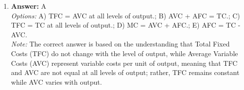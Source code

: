 \documentclass[12pt]{article}
\begin{document}
\begin{enumerate}[label=\arabic*.]
\\ \textit{Options:} A) Society does not get enough output.; B) There is perfect competition in the market, leading to an efficient outcome.; C) Monopolistically competitive firms produce at the minimum of the average cost curve.; D) There is a socially efficient allocation of resources.; E) The firm's profits are minimized, leading to an equitable distribution of resources.
\\ \textit{Note:} In a monopolistically competitive market, when marginal cost is below price, it indicates that the firm is producing less than the socially optimal output level, leading to a deadweight loss and underutilization of resources, resulting in societal inefficiency.
\item \textbf{Answer:} A
\\ \textit{Options:} A) TFC = AVC at all levels of output.; B) AVC + AFC = TC.; C) TFC = TC at all levels of output.; D) MC = AVC + AFC.; E) AFC = TC - AVC.
\\ \textit{Note:} The correct answer is based on the understanding that Total Fixed Costs (TFC) do not change with the level of output, while Average Variable Costs (AVC) represent variable costs per unit of output, meaning that TFC and AVC are not equal at all levels of output; rather, TFC remains constant while AVC varies with output.
\end{enumerate}
\end{document}
